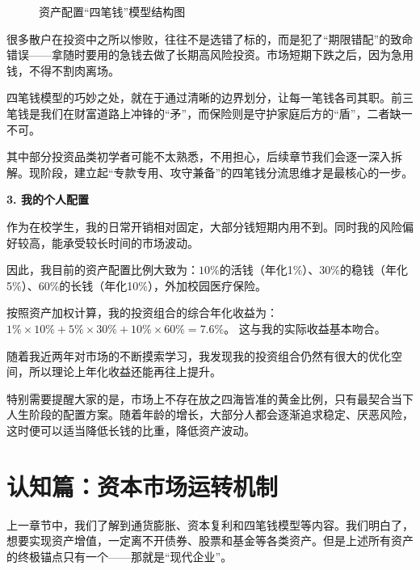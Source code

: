 \documentclass[12pt,openany]{book}
\newcommand{\subhead}[1]{%
    \par\vspace{0.5\baselineskip}%
    \noindent\textbf{#1}\par%
    \vspace{0.5\baselineskip}%
}
\begin{document}
\begin{figure}[tbp]
    \caption{资产配置“四笔钱”模型结构图}
    \label{fig:four_pots_matrix}
\end{figure}

很多散户在投资中之所以惨败，往往不是选错了标的，而是犯了“期限错配”的致命错误——拿随时要用的急钱去做了长期高风险投资。市场短期下跌之后，因为急用钱，不得不割肉离场。

四笔钱模型的巧妙之处，就在于通过清晰的边界划分，让每一笔钱各司其职。前三笔钱是我们在财富道路上冲锋的“矛”，而保险则是守护家庭后方的“盾”，二者缺一不可。

其中部分投资品类初学者可能不太熟悉，不用担心，后续章节我们会逐一深入拆解。现阶段，建立起“专款专用、攻守兼备”的四笔钱分流思维才是最核心的一步。

\subhead{3. 我的个人配置}

作为在校学生，我的日常开销相对固定，大部分钱短期内用不到。同时我的风险偏好较高，能承受较长时间的市场波动。

因此，我目前的资产配置比例大致为：$10\%$的活钱（年化1\%）、$30\%$的稳钱（年化5\%）、$60\%$的长钱（年化10\%），外加校园医疗保险。

按照资产加权计算，我的投资组合的综合年化收益为：$1\% \times 10\% + 5\% \times 30\% + 10\% \times 60\% = 7.6\%$。
这与我的实际收益基本吻合。

随着我近两年对市场的不断摸索学习，我发现我的投资组合仍然有很大的优化空间，所以理论上年化收益还能再往上提升。

特别需要提醒大家的是，市场上不存在放之四海皆准的黄金比例，只有最契合当下人生阶段的配置方案。随着年龄的增长，大部分人都会逐渐追求稳定、厌恶风险，这时便可以适当降低长钱的比重，降低资产波动。


\chapter{认知篇：资本市场运转机制}

上一章节中，我们了解到通货膨胀、资本复利和四笔钱模型等内容。我们明白了，想要实现资产增值，一定离不开债券、股票和基金等各类资产。但是上述所有资产的终极锚点只有一个——那就是“现代企业”。
\end{document}
